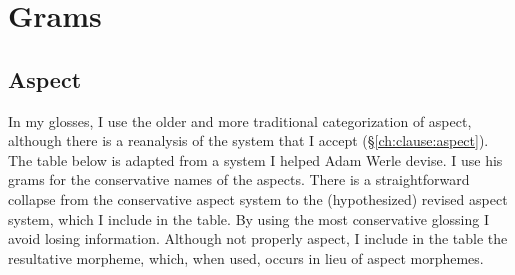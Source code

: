 \newpage

\section{Grams} \label{appendix:grams}

\subsection{Aspect}

In my glosses, I use the older and more traditional categorization of aspect, although there is a reanalysis of the system that I accept (\S\ref{ch:clause:aspect}). The table below is adapted from a system I helped Adam Werle devise. I use his grams for the conservative names of the aspects. There is a straightforward collapse from the conservative aspect system to the (hypothesized) revised aspect system, which I include in the table. By using the most conservative glossing I avoid losing information. Although not properly aspect, I include in the table the resultative morpheme, which, when used, occurs in lieu of aspect morphemes.

